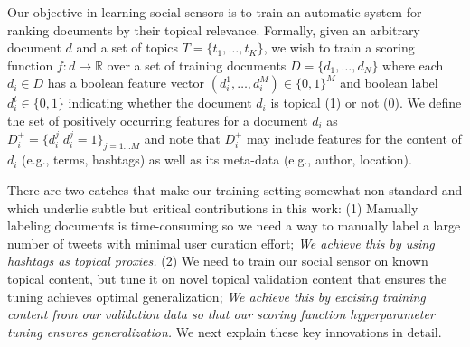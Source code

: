 

Our objective in learning social sensors is to train an automatic
system for ranking documents by their topical relevance.  Formally,
given an arbitrary document $d$ and a set of topics $T = \{
t_1,\ldots,t_K\}$, we wish to train a scoring function $f\!\!:\!\!d \rightarrow \mathbb{R}$
over a set of training documents $D = \{
d_1,\ldots,d_N \}$ where each $d_i \in D$ has a boolean feature vector
$(d_i^1,\ldots,d_i^M) \in \{0,1\}^M$ and boolean label $d_i^t \in \{
0,1 \}$ indicating whether the document $d_i$ is topical (1) or not
(0).  We define the set of positively occurring features for a document
$d_i$ as $D_i^+ = \{ d_i^j | d_i^j=1 \}_{j=1\ldots M}$ and note that
$D_i^+$ may include features for the content of $d_i$ (e.g., terms, 
hashtags) as well as its meta-data (e.g., author, location).

There are two catches that make our training setting somewhat
non-standard and which underlie subtle but critical contributions in this
work:  (1) Manually labeling documents is time-consuming so
we need a way to manually label a large number of tweets with minimal
user curation effort; \emph{We achieve this by using hashtags as topical proxies.}
(2) We need to train our social sensor on
known topical content, but tune it on novel topical validation content 
that ensures the tuning achieves optimal generalization; \emph{We achieve this by 
excising training content from our validation data so that our scoring
function hyperparameter tuning ensures generalization.}
We next explain these key innovations in detail.

%
%


